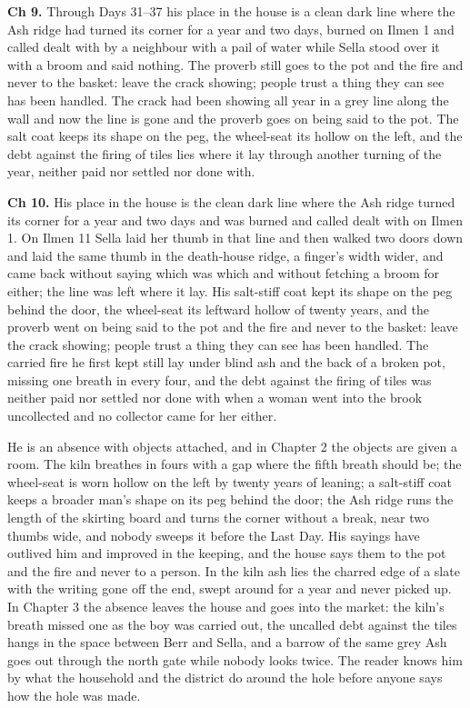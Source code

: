 \documentclass{design/chronicle}
\begin{document}
{\textbf{Ch 9.} Through Days 31–37 his place in the house is a clean dark line where the Ash ridge had turned its corner for a year and two days, burned on Ilmen 1 and called dealt with by a neighbour with a pail of water while Sella stood over it with a broom and said nothing. The proverb still goes to the pot and the fire and never to the basket: leave the crack showing; people trust a thing they can see has been handled. The crack had been showing all year in a grey line along the wall and now the line is gone and the proverb goes on being said to the pot. The salt coat keeps its shape on the peg, the wheel-seat its hollow on the left, and the debt against the firing of tiles lies where it lay through another turning of the year, neither paid nor settled nor done with.

\textbf{Ch 10.} His place in the house is the clean dark line where the Ash ridge turned its corner for a year and two days and was burned and called dealt with on Ilmen 1. On Ilmen 11 Sella laid her thumb in that line and then walked two doors down and laid the same thumb in the death-house ridge, a finger’s width wider, and came back without saying which was which and without fetching a broom for either; the line was left where it lay. His salt-stiff coat kept its shape on the peg behind the door, the wheel-seat its leftward hollow of twenty years, and the proverb went on being said to the pot and the fire and never to the basket: leave the crack showing; people trust a thing they can see has been handled. The carried fire he first kept still lay under blind ash and the back of a broken pot, missing one breath in every four, and the debt against the firing of tiles was neither paid nor settled nor done with when a woman went into the brook uncollected and no collector came for her either.

He is an absence with objects attached, and in Chapter 2 the objects are given a room. The kiln breathes in fours with a gap where the fifth breath should be; the wheel-seat is worn hollow on the left by twenty years of leaning; a salt-stiff coat keeps a broader man’s shape on its peg behind the door; the Ash ridge runs the length of the skirting board and turns the corner without a break, near two thumbs wide, and nobody sweeps it before the Last Day. His sayings have outlived him and improved in the keeping, and the house says them to the pot and the fire and never to a person. In the kiln ash lies the charred edge of a slate with the writing gone off the end, swept around for a year and never picked up. In Chapter 3 the absence leaves the house and goes into the market: the kiln’s breath missed one as the boy was carried out, the uncalled debt against the tiles hangs in the space between Berr and Sella, and a barrow of the same grey Ash goes out through the north gate while nobody looks twice. The reader knows him by what the household and the district do around the hole before anyone says how the hole was made.

}
\end{document}
